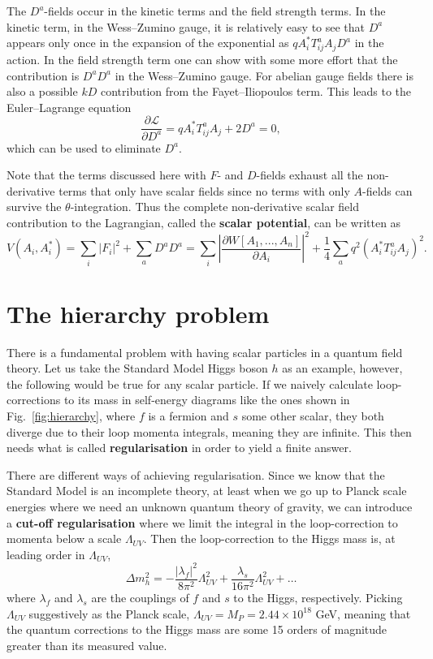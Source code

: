 \documentclass[notes.tex]{subfiles}
\begin{document}
The $D^a$-fields occur in the kinetic terms and the field strength terms.  In the kinetic term, in the Wess--Zumino gauge, it is relatively easy to see that $D^a$ appears only once in the expansion of the exponential as $qA_i^*T_{ij}^aA_jD^a$ in the action. In the field strength term one can show with some more effort that the contribution is $D^aD^a$ in the Wess--Zumino gauge. For abelian gauge fields there is also a possible $kD$ contribution from the Fayet--Iliopoulos term. This leads to the Euler--Lagrange  equation 
\[\frac{\partial \mathcal{L}}{\partial D^a} = qA_i^*T_{ij}^aA_j + 2D^a = 0,\]
which can be used to eliminate $D^a$.

Note that the terms discussed here with $F$- and $D$-fields exhaust all the non-derivative terms that only have scalar fields since no terms with only $A$-fields can survive the $\theta$-integration. Thus the complete non-derivative scalar field contribution to the Lagrangian, called the {\bf scalar potential}, can be written as
\begin{equation}
V(A_i, A_i^*) = \sum_i |F_i|^2+\sum_a D^aD^a = \sum_i\left|\frac{\partial W[A_1,... ,A_n]}{\partial A_i}\right|^2+ \frac{1}{4} \sum_a q^2 (A_i^*T_{ij}^aA_j)^2.
\label{eq:scalarpotglobal}
\end{equation}




\section{The hierarchy problem}
There is a fundamental problem with having scalar particles in a quantum field theory. Let us take the Standard Model Higgs boson $h$ as an example, however, the following would be true for any scalar particle. If we naively calculate loop-corrections to its mass in self-energy diagrams like the ones shown in Fig.~\ref{fig:hierarchy}, where $f$ is a fermion and $s$ some other scalar, they both diverge due to their loop momenta integrals, meaning they are infinite. This then needs what is called {\bf regularisation} in order to yield a finite answer. 

There are different ways of achieving regularisation. Since we know that the Standard Model is an incomplete theory, at least when we go up to Planck scale energies where we need an unknown quantum theory of gravity, we can introduce a {\bf cut-off regularisation} where we limit the integral in the loop-correction to momenta below a scale $\Lambda_{UV}$. Then the loop-correction to the Higgs mass is, at leading order in $\Lambda_{UV}$,
\begin{equation}
\Delta m_h^2 = -\frac{|\lambda_f|^2}{8\pi^2}\Lambda_{UV}^2 + \frac{\lambda_s}{16\pi^2}\Lambda_{UV}^2+\ldots \label{eq:higgsqdiv}
\end{equation}
where $\lambda_f$ and $\lambda_s$ are the couplings of $f$ and $s$ to the Higgs, respectively. Picking $\Lambda_{UV}$  suggestively as the Planck scale, $\Lambda_{UV} =M_P = 2.44\times 10^{18}$ GeV, meaning that the quantum corrections to the Higgs mass are some 15 orders of magnitude greater than its measured value. 
\end{document}
